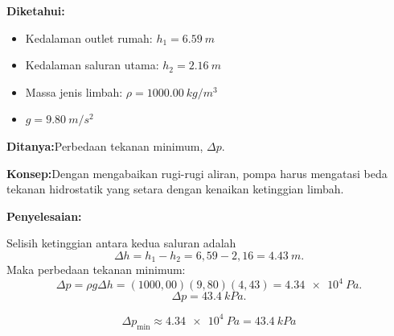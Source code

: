\documentclass[12pt,a4paper]{article}
\newcommand{\diketahui}{\par\medskip\noindent\textbf{Diketahui:}}
\newcommand{\ditanya}{\par\medskip\noindent\textbf{Ditanya:}}
\newcommand{\konsep}{\par\medskip\noindent\textbf{Konsep:}}
\newcommand{\penyelesaian}{\par\medskip\noindent\textbf{Penyelesaian:}\par\nopagebreak}
\begin{document}
\diketahui
\begin{itemize}[nosep]
  \item Kedalaman outlet rumah: $h_1=\SI{6,59}{m}$
  \item Kedalaman saluran utama: $h_2=\SI{2,16}{m}$
  \item Massa jenis limbah: $\rho=\SI{1000,00}{kg/m^3}$
  \item $g=\SI{9,80}{m/s^2}$
\end{itemize}

\ditanya Perbedaan tekanan minimum, $\Delta p$.

\konsep Dengan mengabaikan rugi-rugi aliran, pompa harus mengatasi beda tekanan hidrostatik yang setara dengan kenaikan ketinggian limbah.

\penyelesaian Selisih ketinggian antara kedua saluran adalah
\[
\Delta h=h_1-h_2=6{,}59-2{,}16=\SI{4,43}{m}.
\]
Maka perbedaan tekanan minimum:
\[
\Delta p=\rho g\Delta h
=(1000{,}00)(9{,}80)(4{,}43)
=\SI{4,34e4}{Pa}.
\]
\[
\Delta p=\SI{43,4}{kPa}.
\]

\begin{jawaban}
\[
\boxed{\Delta p_{\min}\approx\SI{4,34e4}{Pa}
=\SI{43,4}{kPa}}
\]
\end{jawaban}
\end{document}
